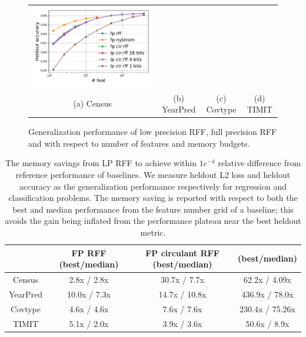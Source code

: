 \begin{figure}
\begin{tabular}{c@{\hskip 0in}c@{\hskip 0in}c@{\hskip 0in}c}
		\includegraphics[width=0.3\linewidth]{figures/timit_accuracy_vs_n_feat.pdf} \\
		(a) Census & (b) YearPred & (c) Covtype & (d) TIMIT \\
	\end{tabular}
	\caption{Generalization performance of low precision RFF, full precision RFF and \Nystrom with respect to number of features and memory budgets.}
	\label{fig:generalizatio_col}
\end{figure}


\begin{table}
	\centering
	\begin{tabular}{c c c c}
		\hline
		& FP RFF (best/median) & FP circulant RFF (best/median) & \Nystrom (best/median) \\
		\hline
		\hline
		Census & 2.8x / 2.8x & 30.7x / 7.7x & 62.2x / 4.09x \\
		YearPred & 10.0x / 7.3x & 14.7x / 10.8x & 436.9x / 78.0x \\ 
		Covtype & 4.6x / 4.6x & 7.6x / 7.6x & 230.4x / 75.26x \\ 
		TIMIT & 5.1x / 2.0x & 3.9x / 3.6x & 50.6x / 8.9x \\ 
		\hline
	\end{tabular}
	\caption{The memory savings from LP RFF to achieve within $1e^{-4}$ relative difference from reference performance of baselines. We measure heldout L2 loss and heldout accuracy as the generalization performance respectively for regression and classification problems. The memory saving is reported with respect to both the best and median performance from the feature number grid of a baseline; this avoids the gain being inflated from the performance plateau near the best heldout metric. }
	\label{fig:mem_saving}
\end{table}

